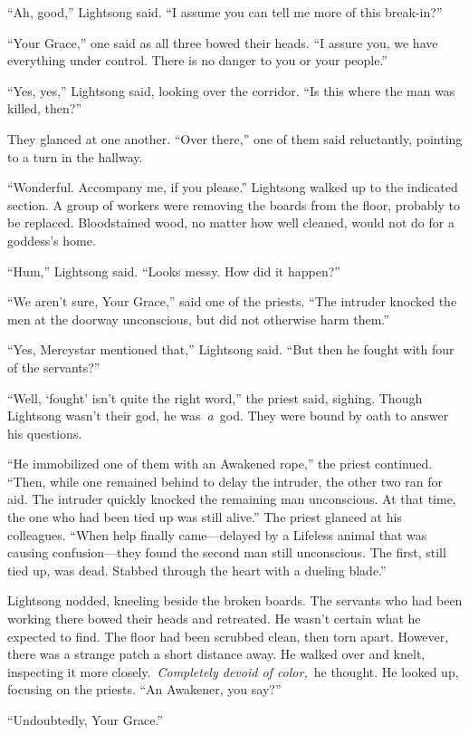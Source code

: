 “Ah, good,” Lightsong said. “I assume you can tell me more of this break-in?”

“Your Grace,” one said as all three bowed their heads. “I assure you, we have everything under control. There is no danger to you or your people.”

“Yes, yes,” Lightsong said, looking over the corridor. “Is this where the man was killed, then?”

They glanced at one another. “Over there,” one of them said reluctantly, pointing to a turn in the hallway.

“Wonderful. Accompany me, if you please.” Lightsong walked up to the indicated section. A group of workers were removing the boards from the floor, probably to be replaced. Bloodstained wood, no matter how well cleaned, would not do for a goddess’s home.

“Hum,” Lightsong said. “Looks messy. How did it happen?”

“We aren’t sure, Your Grace,” said one of the priests. “The intruder knocked the men at the doorway unconscious, but did not otherwise harm them.”

“Yes, Mercystar mentioned that,” Lightsong said. “But then he fought with four of the servants?”

“Well, ‘fought’ isn’t quite the right word,” the priest said, sighing. Though Lightsong wasn’t their god, he was~\textit{a}~god. They were bound by oath to answer his questions.

“He immobilized one of them with an Awakened rope,” the priest continued. “Then, while one remained behind to delay the intruder, the other two ran for aid. The intruder quickly knocked the remaining man unconscious. At that time, the one who had been tied up was still alive.” The priest glanced at his colleagues. “When help finally came—delayed by a Lifeless animal that was causing confusion—they found the second man still unconscious. The first, still tied up, was dead. Stabbed through the heart with a dueling blade.”

Lightsong nodded, kneeling beside the broken boards. The servants who had been working there bowed their heads and retreated. He wasn’t certain what he expected to find. The floor had been scrubbed clean, then torn apart. However, there was a strange patch a short distance away. He walked over and knelt, inspecting it more closely.~\textit{Completely devoid of color,}~he thought. He looked up, focusing on the priests. “An Awakener, you say?”

“Undoubtedly, Your Grace.”

